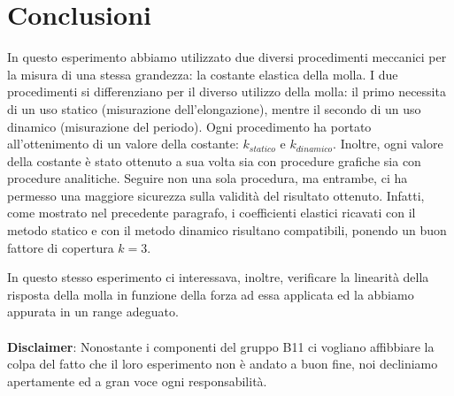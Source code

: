 \section{Conclusioni}
In questo esperimento abbiamo utilizzato due diversi procedimenti meccanici per la misura di una stessa grandezza: la costante elastica della molla. I due procedimenti si differenziano per il diverso utilizzo della molla: il primo necessita di un uso statico (misurazione dell'elongazione), mentre il secondo di un uso dinamico (misurazione del periodo). Ogni procedimento ha portato all'ottenimento di un valore della costante: $k_{statico}$ e $k_{dinamico}$. Inoltre, ogni valore della costante è stato ottenuto a sua volta sia con procedure grafiche sia con procedure analitiche.
Seguire non una sola procedura, ma entrambe, ci ha permesso una maggiore sicurezza sulla validità del risultato ottenuto. Infatti, come mostrato nel precedente paragrafo, i coefficienti elastici ricavati con il metodo statico e con il metodo dinamico risultano compatibili, ponendo un buon fattore di copertura $k=3$.

In questo stesso esperimento ci interessava, inoltre, verificare la linearità della risposta della molla in funzione della forza ad essa applicata ed la abbiamo appurata in un range adeguato.
\\
\\


\textbf{Disclaimer}: Nonostante i componenti del gruppo B11 ci vogliano affibbiare la colpa del fatto che il loro esperimento non è andato a buon fine, noi decliniamo apertamente ed a gran voce ogni responsabilità.